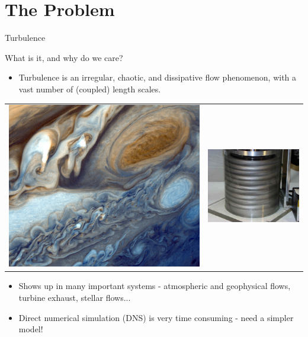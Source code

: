 \documentclass[10pt]{beamer}
\begin{document}
\section{The Problem}
\begin{frame}{Turbulence}{}
\begin{block}{What is it, and why do we care?}
  \begin{itemize}
    \item<1->Turbulence is an irregular, chaotic, and dissipative flow phenomenon, with a vast number of (coupled) length scales. 
  \end{itemize}
\begin{tabular}{cc}
\includegraphics[scale=0.1]{Images/jupiter-v1} & \includegraphics[scale=0.4]{Images/TaylorCouette_Banded}
\end{tabular}
\begin{itemize}
\item<1-> Shows up in many important systems - atmospheric and geophysical flows, turbine exhaust, stellar flows...
\item<2-> Direct numerical simulation (DNS) is very time consuming - need a simpler model! 
\end{itemize}
\end{block}
\end{frame}
\end{document}
